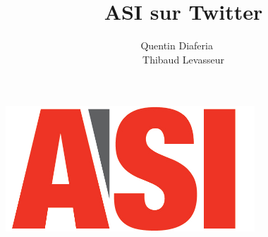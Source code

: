 \documentclass[a4paper,12pt]{article}
\title{ASI sur Twitter}
\author{Quentin Diaferia ~~\\ Thibaud Levasseur}
\begin{document}
\maketitle
\begin{center}
\includegraphics[width=0.7\textwidth]{images/logo.jpg}
\end{center}
\newpage
\tableofcontents
\newpage

\newpage

\newpage

\newpage

\newpage

\newpage

\end{document}
